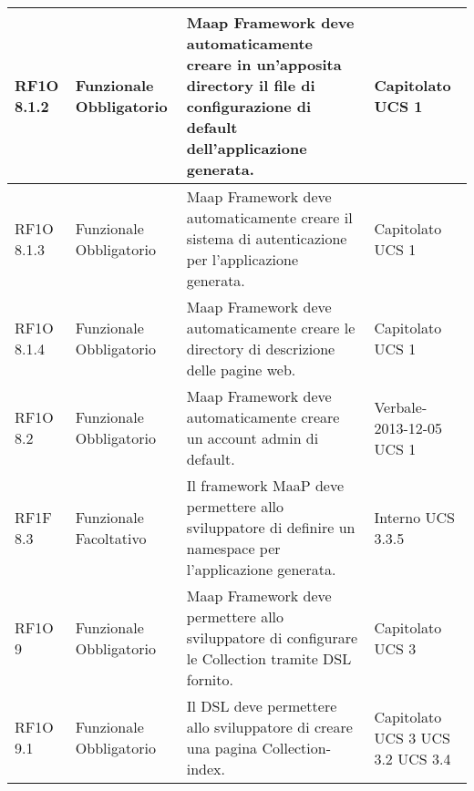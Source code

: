 \begin{center}
\begin{longtable}{ | l | p{2cm} | p{5cm} | p{1.7cm} |}
        RF1O 8.1.2 & Funzionale \newline  Obbligatorio  & Maap Framework deve automaticamente creare in un’apposita directory il file di configurazione di default dell’applicazione generata. &  Capitolato \newline  UCS 1 \newline  \\ \hline      
        RF1O 8.1.3 & Funzionale \newline  Obbligatorio  & Maap Framework deve automaticamente creare il sistema di autenticazione per l’applicazione generata. &  Capitolato \newline  UCS 1 \newline  \\ \hline      
        RF1O 8.1.4 & Funzionale \newline  Obbligatorio  & Maap Framework deve automaticamente creare le directory di descrizione delle pagine web. &  Capitolato \newline  UCS 1 \newline  \\ \hline      
        RF1O 8.2 & Funzionale \newline  Obbligatorio  & Maap Framework deve automaticamente creare un account admin di default. &  Verbale-2013-12-05 \newline  UCS 1 \newline  \\ \hline      
        RF1F 8.3 & Funzionale \newline  Facoltativo  & Il framework MaaP deve permettere allo sviluppatore di definire un namespace per l’applicazione generata. &  Interno \newline  UCS 3.3.5 \newline  \\ \hline      
        RF1O 9 & Funzionale \newline  Obbligatorio  & Maap Framework deve permettere allo sviluppatore di configurare le Collection tramite DSL fornito. &  Capitolato \newline  UCS 3 \newline  \\ \hline      
        RF1O 9.1 & Funzionale \newline  Obbligatorio  & Il DSL deve permettere allo sviluppatore di creare una pagina Collection-index. &  Capitolato \newline  UCS 3 \newline  UCS 3.2 \newline  UCS 3.4 \newline  \\ \hline      

\end{longtable}
\end{center}
